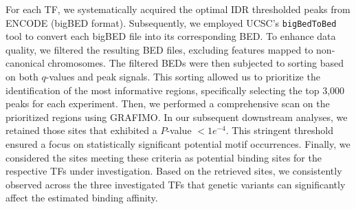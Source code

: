 \documentclass[a4paper, titlepage, openright]{book}
\newcommand{\grafimo}{GRAFIMO\xspace}
\begin{document}
%
\begin{table}[!]
    \centering
    \caption[ENCODE ChIP-seq experiments]{\textbf{ENCODE ChIP-seq experiments.} To test our software we searched potential occurrences of three transcription factor motifs (CTCF, ATF3, and GATA1) in a hg38 genome graph enriched with genetic variants and haplotypes of 2,548 individuals from 1000 Genomes Project phase 3.}
    \label{tab:table-encode-experiment}
\end{table}
%
For each TF, we systematically acquired the optimal IDR thresholded peaks from ENCODE (bigBED format). Subsequently, we employed UCSC's \texttt{bigBedToBed} tool \citep{kent2010bigwig} to convert each bigBED file into its corresponding BED. To enhance data quality, we filtered the resulting BED files, excluding features mapped to non-canonical chromosomes. The filtered BEDs were then subjected to sorting based on both $q$-values and peak signals. This sorting allowed us to prioritize the identification of the most informative regions, specifically selecting the top 3,000 peaks for each experiment. Then, we performed a comprehensive scan on the prioritized regions using \grafimo. In our subsequent downstream analyses, we retained those sites that exhibited a $P$-value $< 1e^{-4}$. This stringent threshold ensured a focus on statistically significant potential motif occurrences. Finally, we considered the sites meeting these criteria as potential binding sites for the respective TFs under investigation. Based on the retrieved sites, we consistently observed across the three investigated TFs that genetic variants can significantly affect the estimated binding affinity. 
\end{document}
